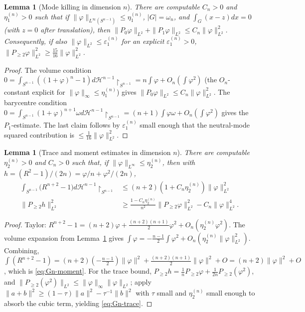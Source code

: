 \documentclass[11pt]{amsart}
\newtheorem{lemma}[theorem]{Lemma}
\newcommand{\eps}{\varepsilon}
\newcommand{\dHnm}{d\mathcal H^{n-1}\!\restriction_{S^{n-1}}}
\begin{document}
\begin{lemma}[Mode killing in dimension $n$]\label{lem:Gn-modes}
There are computable $C_n>0$ and $\eta_1^{(n)}>0$ such that if
$\|\varphi\|_{L^\infty(S^{n-1})}\le\eta_1^{(n)}$, $|G|=\omega_n$, and
$\int_G(x-z)dx=0$ (with $z=0$ after translation), then
$\|P_0\varphi\|_{L^2}+\|P_1\varphi\|_{L^2}\le C_n\|\varphi\|_{L^2}^2$.
Consequently, if also $\|\varphi\|_{L^2}\le\eps_1^{(n)}$ for an
explicit $\eps_1^{(n)}>0$,
\(\|P_{\ge 2}\varphi\|_{L^2}^2\ge\tfrac{15}{16}\|\varphi\|_{L^2}^2\).
\end{lemma}

\begin{proof}
The volume condition $0=\int_{S^{n-1}}((1+\varphi)^n-1)\dHnm
=n\int\varphi+O_n(\int\varphi^2)$ (the $O_n$-constant explicit for
$\|\varphi\|_\infty\le\eta_1^{(n)}$) gives $\|P_0\varphi\|_{L^2}\le
C_n\|\varphi\|_{L^2}^2$.  The barycentre condition $0=\int_{S^{n-1}}
(1+\varphi)^{n+1}\omega\dHnm=(n+1)\int\varphi\omega+O_n(\int\varphi
^2)$ gives the $P_1$-estimate.  The last claim follows by
$\eps_1^{(n)}$ small enough that the neutral-mode squared
contribution is $\le\tfrac{1}{16}\|\varphi\|_{L^2}^2$.
\end{proof}

\begin{lemma}[Trace and moment estimates in dimension $n$]
\label{lem:Gn-taylor}
There are computable $\eta_2^{(n)}>0$ and $C_n>0$ such that, if
$\|\varphi\|_{L^\infty}\le\eta_2^{(n)}$, then with
$h=(R^2-1)/(2n)=\varphi/n+\varphi^2/(2n)$,
\begin{align}
   \int_{S^{n-1}}\bigl(R^{n+2}-1\bigr)\dHnm
      &\le (n+2)(1+C_n\eta_2^{(n)})\|\varphi\|_{L^2}^2
   \label{eq:Gn-moment}\\
   \|P_{\ge 2}h\|_{L^2}^2
      &\ge\frac{1-C_n\eta_2^{(n)}}{n^2}\|P_{\ge 2}\varphi\|_{L^2}^2
         -C_n\|\varphi\|_{L^2}^4.
   \label{eq:Gn-trace}
\end{align}
\end{lemma}

\begin{proof}
Taylor: $R^{n+2}-1=(n+2)\varphi+\tfrac{(n+2)(n+1)}{2}\varphi^2+O_n
(\eta_2^{(n)}\varphi^2)$.  The volume expansion from
Lemma~\ref{lem:Gn-modes} gives $\int\varphi=-\tfrac{n-1}{2}\int
\varphi^2+O_n(\eta_2^{(n)}\|\varphi\|_{L^2}^2)$.  Combining,
$\int(R^{n+2}-1)=(n+2)(-\tfrac{n-1}{2})\|\varphi\|^2+\tfrac{(n+2)
(n+1)}{2}\|\varphi\|^2+O=(n+2)\|\varphi\|^2+O$, which is
\eqref{eq:Gn-moment}.  For the trace bound,
$P_{\ge 2}h=\tfrac{1}{n}P_{\ge 2}\varphi+\tfrac{1}{2n}P_{\ge 2}
(\varphi^2)$, and $\|P_{\ge 2}(\varphi^2)\|_{L^2}\le\|\varphi\|_
\infty\|\varphi\|_{L^2}$; apply $\|a+b\|^2\ge(1-\tau)\|a\|^2-
\tau^{-1}\|b\|^2$ with $\tau$ small and $\eta_2^{(n)}$ small enough
to absorb the cubic term, yielding \eqref{eq:Gn-trace}.
\end{proof}
\end{document}
